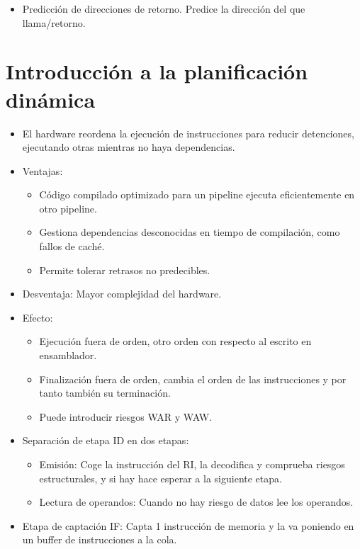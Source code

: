 \documentclass[12pt, twoside, openright]{report} %
\begin{document}
\begin{itemize}
\begin{itemize}
\begin{itemize}
        \item Predicción de direcciones de retorno. Predice la dirección del
          que llama/retorno.
      \end{itemize}
    \end{itemize}
  \end{itemize}
  \section{Introducción a la planificación dinámica}

  \begin{itemize}
  
  \item
    El hardware reordena la ejecución de instrucciones para reducir
    detenciones, ejecutando otras mientras no haya dependencias.
  \item
    Ventajas:

    \begin{itemize}
    
    \item
      Código compilado optimizado para un pipeline ejecuta
      eficientemente en otro pipeline.
    \item
      Gestiona dependencias desconocidas en tiempo de compilación, como
      fallos de caché.
    \item
      Permite tolerar retrasos no predecibles.
    \end{itemize}
  \item
    Desventaja: Mayor complejidad del hardware.
  \item
    Efecto:

    \begin{itemize}
    
    \item
      Ejecución fuera de orden, otro orden con respecto al escrito en
      ensamblador.
    \item
      Finalización fuera de orden, cambia el orden de las instrucciones
      y por tanto también su terminación.
    \item
      Puede introducir riesgos WAR y WAW.
    \end{itemize}
  \item
    Separación de etapa ID en dos etapas:

    \begin{itemize}
    
    \item
      Emisión: Coge la instrucción del RI, la decodifica y comprueba
      riesgos estructurales, y si hay hace esperar a la siguiente etapa.
    \item
      Lectura de operandos: Cuando no hay riesgo de datos lee los
      operandos.
    \end{itemize}
  \item
    Etapa de captación IF: Capta 1 instrucción de memoria y la va
    poniendo en un buffer de instrucciones a la cola.


\end{itemize}
\end{document}
